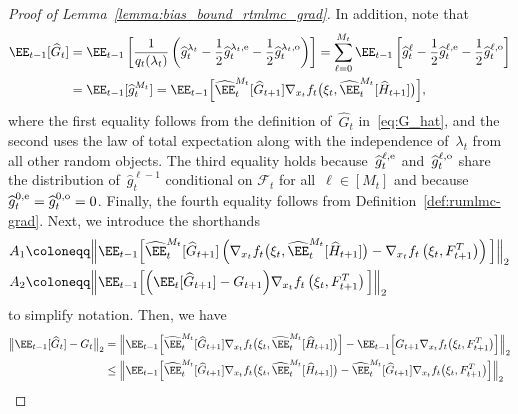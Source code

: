 \documentclass[11pt]{article}
\let\hat\widehat
\begin{document}
\begin{proof}[Proof of Lemma~\ref{lemma:bias_bound_rtmlmc_grad}]
In addition, note that
\begin{equation}
    \begin{aligned}\label{eq:rtmlmc_grad_bias}
    \EE_{t-1}[\hat{G}_t] & =  \EE_{t-1}\left[\frac{1}{q_t(\lambda_t)} \left(\hat{g}_t^{\lambda_t}-\frac{1}{2}\hat{g}_t^{\lambda_t, {\rm e}} -\frac{1}{2}\hat{g}_t^{\lambda_t, {\rm o}} \right)\right] = \sum_{\ell=0}^{M_t} \EE_{t-1}\left[\hat{g}_t^{\ell}-\frac{1}{2}\hat{g}_t^{\ell, {\rm e}} -\frac{1}{2}\hat{g}_t^{\ell, {\rm o}} \right] \\
    &  = \EE_{t-1} [\hat{g}_t^{M_t}] 
    = \EE_{t-1}\Big[ \hat\EE_t^{M_t}[\hat{G}_{t+1}] \nabla_{x_t} f_t \big(\xi_t, \hat\EE_t^{M_t}[\hat{H}_{t+1}] \big)\Big],
\end{aligned}
\end{equation}
where the first equality follows from the definition of~$\hat{G}_t$ in~\eqref{eq:G_hat}, and the second uses the law of total expectation along with the independence of~$\lambda_t$ from all other random objects. The third equality holds because~$\hat{g}_t^{\ell,{\rm e}}$ and~$\hat{g}_t^{\ell,{\rm o}}$ share the distribution of~$\hat{g}_t^{\ell-1}$ conditional on $\mathcal F_t$ for all~$\ell \in [M_t]$ and because~$\hat{g}_t^{0,{\rm e}} = \hat{g}_t^{0,{\rm o}} = 0$. Finally, the fourth equality follows from Definition~\ref{def:rumlmc-grad}. Next, we introduce the shorthands
\begin{align*}
    A_1 & \coloneqq \Big\|\EE_{t-1}\Big[\hat\EE_t^{M_t}[\hat{G}_{t+1}] \left(\nabla_{x_t} f_t \big(\xi_t,\hat\EE_t^{M_t}[\hat{H}_{t+1}] \big) -\nabla_{x_t} f_t \left(\xi_t,F_{t+1}^T\right)\right)\Big] \Big\|_2\\
    A_2 & \coloneqq \Big\|\EE_{t-1}\Big[\Big(\EE_{t}[\hat{G}_{t+1}]-G_{t+1}\Big) \nabla_{x_t} f_t \left(\xi_t,F_{t+1}^T\right) \Big] \Big\|_2
\end{align*}
to simplify notation. Then, we have 
\begin{equation}\label{eq:bias_t_th_step}
\begin{aligned}
        \big\| \EE_{t-1}[\hat{G}_t] - G_t\big\|_2 & = \Big\|\EE_{t-1}\Big[\hat\EE_t^{M_t}[\hat{G}_{t+1}] \nabla_{x_t} f_t \big(\xi_t,\hat\EE_t^{M_t}[\hat{H}_{t+1}] \big) \Big] - \EE_{t-1}\Big[G_{t+1}\nabla_{x_t} f_t \big(\xi_t,F_{t+1}^T\big)\Big] \Big\|_2 \\
        &\leq \Big\|\EE_{t-1}\Big[\hat\EE_t^{M_t}[\hat{G}_{t+1}]\nabla_{x_t} f_t \big(\xi_t,\hat\EE_t^{M_t}[\hat{H}_{t+1}] \big) - \hat\EE_t^{M_t}[\hat{G}_{t+1}]\nabla_{x_t} f_t \big(\xi_t,F_{t+1}^T\big)\Big] \Big\|_2\\

\end{aligned}
\end{equation}
\end{proof}
\end{document}
